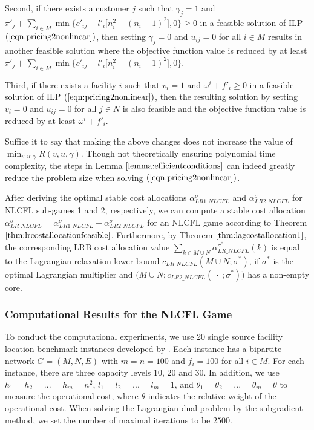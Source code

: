 \documentclass[ijoc,nonblindrev]{informs3} %
\begin{document}
Second, if there exists a customer $j$ such that $\gamma_j = 1$ and $\pi'_j+\sum_{i\in M}\min\{c'_{ij}- l'_i\big[n_i^2 - (n_i-1)^2\big],0\} \geq 0$ in a feasible solution of ILP $(\ref{eqn:pricing2nonlinear})$, then setting $\gamma_j = 0$ and $u_{ij} = 0$ for all $i \in M$ results in another feasible solution where the objective function value is reduced by at least  $\pi'_j+\sum_{i\in M}\min\{c'_{ij}- l'_i\big[n_i^2 - (n_i-1)^2\big],0\}$.

Third, if there exists a facility $i$ such that $v_i = 1$ and $\omega^{i} + f'_{i} \geq 0$ in a feasible solution of ILP $(\ref{eqn:pricing2nonlinear})$, then the resulting solution by setting $v_i = 0$ and $u_{ij} = 0$ for all $j \in N$ is also feasible and the objective function value is reduced by at least $\omega^{i} + f'_{i}$.
\hfill\Halmos


Suffice it to say that making the above changes does not increase the value of $\min_{v;u;\gamma} R(v,u,\gamma)$.
Though not theoretically ensuring polynomial time complexity, the steps  in Lemma $\ref{lemma:efficientconditions}$ can indeed greatly reduce the problem size when solving $(\ref{eqn:pricing2nonlinear})$. %

After deriving the optimal stable cost allocations $\alpha_{LR1\_NLCFL}^{\sigma}$ and $\alpha_{LR2\_NLCFL}^{\sigma}$ for NLCFL sub-games 1 and 2, respectively, we can compute a stable cost allocation $\alpha_{LR\_NLCFL}^{\sigma} = \alpha_{LR1\_NLCFL}^{\sigma} + \alpha_{LR2\_NLCFL}^{\sigma}$ for an NLCFL game according to Theorem $\ref{thm:lrcostallocationfeasible}$. Furthermore, by Theorem $\ref{thm:lagcostallocation1}$, the corresponding LRB cost allocation value $\sum_{k \in M\cup N}\alpha^{\sigma^*}_{LR\_NLCFL}(k)$ is equal to the Lagrangian relaxation lower bound $c_{LR\_NLCFL}(M \cup N;\sigma^*)$, if $\sigma^*$ is the optimal Lagrangian multiplier and $\big(M \cup N;c_{LR2\_NLCFL}(\ \cdot\ ;\sigma^*)\big)$ has a non-empty core.




\subsubsection{Computational Results for the NLCFL Game}\label{sec:nlcflcomputation}
To conduct the computational experiments, we use 20 single source facility location benchmark instances developed by \cite{Benchmark}. Each instance has a bipartite network $G=(M,N,E)$ with $m=n=100$ and $f_i=100$ for all $i \in M$.   
For each instance, there are three capacity levels  10, 20 and 30. 
In addition, we use $h_1 = h_2 = ... = h_m = n^2$, $l_1 = l_2= ... = l_m = 1$, and $\theta_1 = \theta_2 = ... = \theta_m=\theta$ to measure the operational cost, where $\theta$ indicates the relative weight of the operational cost.
When solving the Lagrangian dual problem by the subgradient method, we set the number of maximal iterations to be $2500$.
\end{document}
